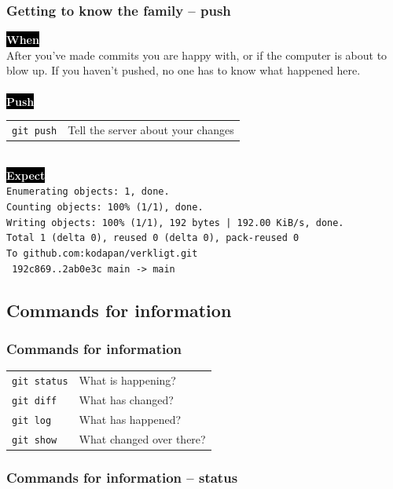\documentclass{beamer}
\newcommand{\keyword}[1]{\hspace{-1.0em}\colorbox{black}{\textcolor{white}{\textbf{#1}}}}
\begin{document}
\begin{frame}
  \frametitle{Getting to know the family -- push}
  \keyword{When}\\
    After you've made commits you are happy with, or if the computer
    is about to blow up. If you haven't pushed, no one has to know what
    happened here.\\
  \\ [0.5em]

  \keyword{Push}\\
  \hspace{-1.0em}
  \begin{tabular}{ll}
    \texttt{git push} & Tell the server about your changes \\
  \end{tabular}
  \\ [0.5em]

  \keyword{Expect}\\ [0.1em]
  \small
  \texttt{Enumerating objects: 1, done.}\\
  \texttt{Counting objects: 100\% (1/1), done.}\\
  \texttt{Writing objects: 100\% (1/1), 192 bytes | 192.00 KiB/s, done.}\\
  \texttt{Total 1 (delta 0), reused 0 (delta 0), pack-reused 0}\\
  \texttt{To github.com:kodapan/verkligt.git}\\
  \texttt{   192c869..2ab0e3c  main -> main}
\end{frame}

\subsection{Commands for information}

\begin{frame}[fragile]
  \frametitle{Commands for information}

  \begin{tabular}{ll}
    \texttt{git status} & What is happening? \\
    \texttt{git diff} & What has changed? \\
    \texttt{git log} & What has happened? \\
    \texttt{git show} & What changed over there? \\
  \end{tabular}

\end{frame}

\begin{frame}
  \frametitle{Commands for information -- status}
\end{frame}
\end{document}
